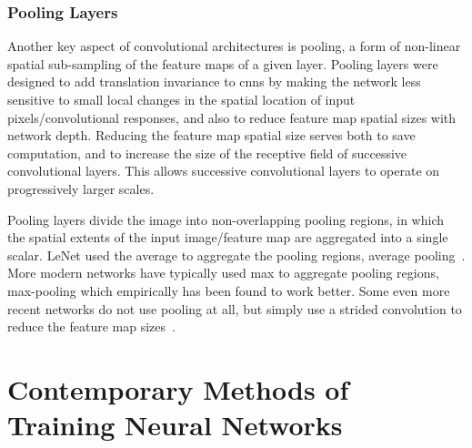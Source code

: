 \documentclass[thesis]{subfiles}
\begin{document}
\subsubsection{Pooling Layers}
Another key aspect of convolutional architectures is pooling, a form of non-linear spatial sub-sampling of the feature maps of a given layer. Pooling layers were designed to add translation invariance to \glspl{cnn} by making the network less sensitive to small local changes in the spatial location of input pixels/convolutional responses, and also to reduce feature map spatial sizes with network depth. Reducing the feature map spatial size serves both to save computation, and to increase the size of the receptive field of successive convolutional layers. This allows successive convolutional layers to operate on progressively larger scales.

Pooling layers divide the image into non-overlapping pooling regions, in which the spatial extents of the input image/feature map are aggregated into a single scalar. LeNet used the average to aggregate the pooling regions, \ie average pooling~\citep{Lecun1998}. More modern networks have typically used max to aggregate pooling regions, \ie max-pooling which empirically has been found to work better. Some even more recent networks do not use pooling at all, but simply use a strided convolution to reduce the feature map sizes~\citep{He2015}.

\section{Contemporary Methods of Training Neural Networks}
\label{section:contemporary}
\end{document}
